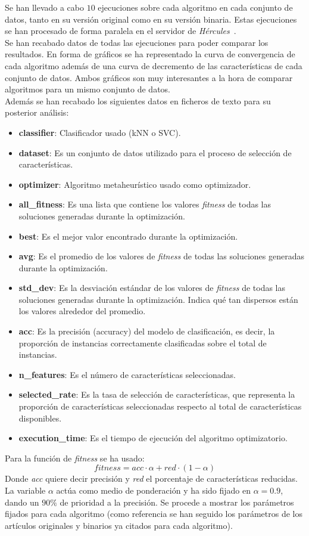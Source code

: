 Se han llevado a cabo $10$ ejecuciones sobre cada algoritmo en cada conjunto de datos, tanto en su versión original como en su versión binaria. Estas ejecuciones se han procesado de forma paralela en el servidor de \textit{Hércules}~\cite{citicugr}.\\[6pt]
Se han recabado datos de todas las ejecuciones para poder comparar los resultados. En forma de gráficos se ha representado la curva de convergencia de cada algoritmo además de una curva de decremento de las características de cada conjunto de datos. Ambos gráficos son muy interesantes a la hora de comparar algoritmos para un mismo conjunto de datos.\\[6pt] 
Además se han recabado los siguientes datos en ficheros de texto para su posterior análisis:
\begin{itemize}
    \item \textbf{classifier}: Clasificador usado (kNN o SVC).
    \item \textbf{dataset}: Es un conjunto de datos utilizado para el proceso de selección de características.
    \item \textbf{optimizer}: Algoritmo metaheurístico usado como optimizador.
    \item \textbf{all\_fitness}: Es una lista que contiene los valores \textit{fitness} de todas las soluciones generadas durante la optimización.
    \item \textbf{best}: Es el mejor valor encontrado durante la optimización.
    \item \textbf{avg}: Es el promedio de los valores de \textit{fitness} de todas las soluciones generadas durante la optimización.
    \item \textbf{std\_dev}: Es la desviación estándar de los valores de \textit{fitness} de todas las soluciones generadas durante la optimización. Indica qué tan dispersos están los valores alrededor del promedio.
    \item \textbf{acc}: Es la precisión (accuracy) del modelo de clasificación, es decir, la proporción de instancias correctamente clasificadas sobre el total de instancias.
    \item \textbf{n\_features}: Es el número de características seleccionadas.
    \item \textbf{selected\_rate}: Es la tasa de selección de características, que representa la proporción de características seleccionadas respecto al total de características disponibles.
    \item \textbf{execution\_time}: Es el tiempo de ejecución del algoritmo optimizatorio.
\end{itemize}
Para la función de \textit{fitness} se ha usado:
\begin{equation}
    fitness = acc\cdot\alpha + red\cdot(1-\alpha)
\end{equation}
Donde \textit{acc} quiere decir precisión y \textit{red} el porcentaje de características reducidas. La variable $\alpha$ actúa como medio de ponderación y ha sido fijado en $\alpha=0.9$, dando un $90\%$ de prioridad a la precisión.
Se procede a mostrar los parámetros fijados para cada algoritmo (como referencia se han seguido los parámetros de los artículos originales y binarios ya citados para cada algoritmo).